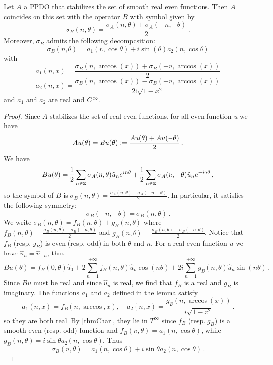 \documentclass[a4paper]{article}
\begin{document}
\begin{Lem}
	\label{TransportPPDO}
	Let $A$ a PPDO that stabilizes the set of smooth real even functions. Then $A$ coincides on this set with the operator $B$ with symbol given by 
	\[\sigma_B(n,\theta) = \frac{\sigma_A(n,\theta) + \sigma_A(-n,-\theta)}{2}\,.\]
	Moreover, $\sigma_B$ admits the following decomposition:
	\[ \sigma_B(n,\theta) = a_1(n,\cos\theta) + i \sin(\theta)a_2(n,\cos\theta) \]
	with 
	\[a_1(n,x) = \frac{\sigma_B(n,\arccos(x)) + \sigma_B(-n,\arccos(x))}{2}\]
	\[a_2(n,x) = \frac{\sigma_B(n,\arccos(x)) - \sigma_B(-n,\arccos(x))}{2i\sqrt{1-x^2}}\] 
	and $a_1$ and $a_2$ are real and $C^{\infty}$. 
\end{Lem}
\begin{proof}
Since $A$ stabilizes the set of real even functions, for all even function $u$ we have 
\[Au(\theta) = Bu(\theta) \mathrel{\mathop:}= \frac{Au(\theta) + Au(-\theta)}{2}\,.\]
We have
\[Bu(\theta) = \frac{1}{2}\sum_{n \in \mathbb{Z}} \sigma_A(n,\theta) \hat{u}_n e^{in\theta} + \frac{1}{2}\sum_{n \in \mathbb{Z}} \sigma_A(n,-\theta)\hat{u}_n e^{-in\theta}\,,\]
so the symbol of $B$ is $\sigma_B(n,\theta) = \frac{\sigma_A(n,\theta) + \sigma_A(-n,-\theta)}{2}$. In particular, it satisfies the following symmetry:
\[\sigma_B(-n,-\theta) = \sigma_B(n,\theta)\,.\] 
We write $\sigma_B(n,\theta) = f_B(n,\theta) + g_B(n,\theta)$ where $f_B(n,\theta) = \frac{\sigma_B(n,\theta) + \sigma_B(-n,\theta)}{2}$ and $g_B(n,\theta) = \frac{\sigma_B(n,\theta) - \sigma_B(-n,\theta)}{2}$. Notice that $f_B$ (resp. $g_B$) is even (resp. odd) in both $\theta$ and $n$. For a real even function $u$ we have $\hat{u}_n = \hat{u}_{-n}$, thus 
\[Bu(\theta) = f_B(0,\theta) \hat{u}_0 + 2\sum_{n = 1}^{+ \infty}f_B(n,\theta)\hat{u}_n\cos(n\theta) + 2i \sum_{n =1}^{+\infty} g_B(n,\theta)\hat{u}_n\sin(n\theta)\,.\]
Since $Bu$ must be real and since $\hat{u}_n$ is real, we find that $f_B$ is a real and $g_B$ is imaginary. The functions $a_1$ and $a_2$ defined in the lemma satisfy
\[a_1(n,x) = f_B(n, \arccos,x),\quad a_2(n,x) = \frac{g_B(n,\arccos(x))}{i\sqrt{1-x^2}}\,.\]
so they are both real. By \autoref{thmChar}, they lie in $T^\infty$ since $f_B$ (resp. $g_B$) is a smooth even (resp. odd) function and  $f_B(n,\theta) = a_1(n,\cos\theta)$, while $g_B(n,\theta) = i \sin \theta a_2(n,\cos\theta)$. Thus 
\[\sigma_B(n,\theta) = a_1(n,\cos\theta) + i \sin\theta a_2(n,\cos\theta)\,. \]
\end{proof}
\end{document}
